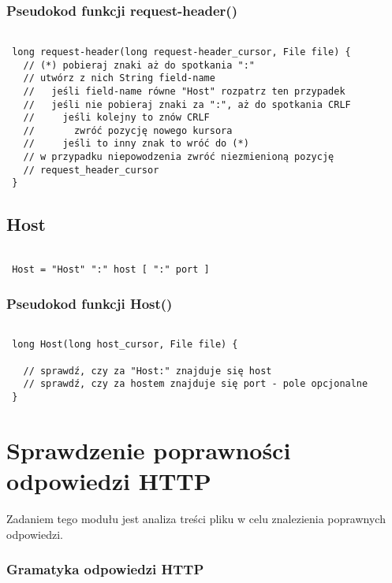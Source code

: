 \documentclass[a4paper,11pt]{report}
\begin{document}
\subsubsection{Pseudokod funkcji request-header()}

\begin{lstlisting}

 long request-header(long request-header_cursor, File file) {
   // (*) pobieraj znaki aż do spotkania ":"
   // utwórz z nich String field-name
   //   jeśli field-name równe "Host" rozpatrz ten przypadek
   //   jeśli nie pobieraj znaki za ":", aż do spotkania CRLF
   //     jeśli kolejny to znów CRLF
   //       zwróć pozycję nowego kursora
   //     jeśli to inny znak to wróć do (*)
   // w przypadku niepowodzenia zwróć niezmienioną pozycję
   // request_header_cursor
 }

\end{lstlisting}

\subsection{Host}

\begin{lstlisting}

 Host = "Host" ":" host [ ":" port ] 

\end{lstlisting}

\subsubsection{Pseudokod funkcji Host()}

\begin{lstlisting}

 long Host(long host_cursor, File file) {
 
   // sprawdź, czy za "Host:" znajduje się host
   // sprawdź, czy za hostem znajduje się port - pole opcjonalne
 } 

\end{lstlisting}

\section{Sprawdzenie poprawności odpowiedzi HTTP}

Zadaniem tego modułu jest analiza treści pliku w celu znalezienia poprawnych odpowiedzi.

\subsubsection{Gramatyka odpowiedzi HTTP}
\end{document}
